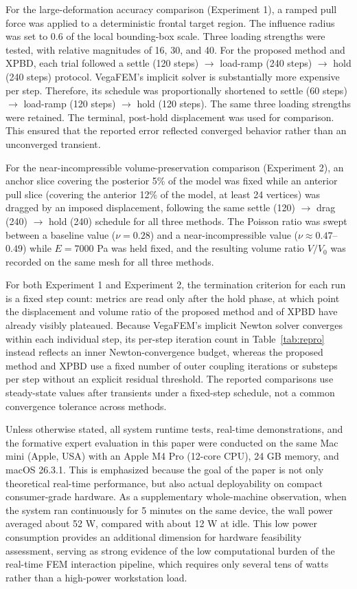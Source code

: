 \documentclass{ieeeaccess}
\begin{document}
For the large-deformation accuracy comparison (Experiment 1), a ramped pull force was applied to a deterministic frontal target region. The influence radius was set to 0.6 of the local bounding-box scale. Three loading strengths were tested, with relative magnitudes of 16, 30, and 40. For the proposed method and XPBD, each trial followed a settle (120 steps) $\rightarrow$ load-ramp (240 steps) $\rightarrow$ hold (240 steps) protocol. VegaFEM's implicit solver is substantially more expensive per step. Therefore, its schedule was proportionally shortened to settle (60 steps) $\rightarrow$ load-ramp (120 steps) $\rightarrow$ hold (120 steps). The same three loading strengths were retained. The terminal, post-hold displacement was used for comparison. This ensured that the reported error reflected converged behavior rather than an unconverged transient.

For the near-incompressible volume-preservation comparison (Experiment 2), an anchor slice covering the posterior 5\% of the model was fixed while an anterior pull slice (covering the anterior 12\% of the model, at least 24 vertices) was dragged by an imposed displacement, following the same settle (120) $\rightarrow$ drag (240) $\rightarrow$ hold (240) schedule for all three methods. The Poisson ratio was swept between a baseline value ($\nu=0.28$) and a near-incompressible value ($\nu\approx0.47$--$0.49$) while $E=7000$ Pa was held fixed, and the resulting volume ratio $V/V_0$ was recorded on the same mesh for all three methods.

For both Experiment 1 and Experiment 2, the termination criterion for each run is a fixed step count: metrics are read only after the hold phase, at which point the displacement and volume ratio of the proposed method and of XPBD have already visibly plateaued. Because VegaFEM's implicit Newton solver converges within each individual step, its per-step iteration count in Table~\ref{tab:repro} instead reflects an inner Newton-convergence budget, whereas the proposed method and XPBD use a fixed number of outer coupling iterations or substeps per step without an explicit residual threshold. The reported comparisons use steady-state values after transients under a fixed-step schedule, not a common convergence tolerance across methods.

Unless otherwise stated, all system runtime tests, real-time demonstrations, and the formative expert evaluation in this paper were conducted on the same Mac mini (Apple, USA) with an Apple M4 Pro (12-core CPU), 24 GB memory, and macOS 26.3.1. This is emphasized because the goal of the paper is not only theoretical real-time performance, but also actual deployability on compact consumer-grade hardware. As a supplementary whole-machine observation, when the system ran continuously for 5 minutes on the same device, the wall power averaged about 52 W, compared with about 12 W at idle. This low power consumption provides an additional dimension for hardware feasibility assessment, serving as strong evidence of the low computational burden of the real-time FEM interaction pipeline, which requires only several tens of watts rather than a high-power workstation load.
\end{document}
